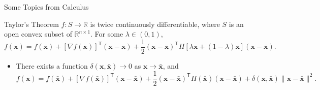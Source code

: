 \documentclass[aspectratio=169,hyperref,UTF8,CJK]{beamer}
\newcommand{\R}{\mathbb{R}}
\newcommand{\trans}{\mathsf{T}}
\newcommand{\vect}[1]{\boldsymbol{#1}}
\begin{document}
\begin{frame}{Some Topics from Calculus}
  \small
  \begin{block}{Taylor's Theorem}
    $f:S\to\R$ is twice continuously differentiable, where $S$ is an open convex subset of $\R^{n\times1}$. For some $\lambda\in(0,1)$,
    \begin{equation*}
      f(\vect{x})=f(\bar{\vect{x}})+[\nabla f(\bar{\vect{x}})]^{\trans}(\vect{x}-\bar{\vect{x}})
      +\frac12(\vect{x}-\bar{\vect{x}})^{\trans}
      H[\lambda\vect{x}+(1-\lambda)\bar{\vect{x}}](\vect{x}-\bar{\vect{x}}).
    \end{equation*}
  \end{block}
  \begin{itemize}
    \item There exists a function $\delta(\vect{x},\bar{\vect{x}})\to0$ as $\vect{x}\to\bar{\vect{x}}$, and
      \begin{equation*}
        f(\vect{x})=f(\bar{\vect{x}})+[\nabla f(\bar{\vect{x}})]^{\trans}(\vect{x}-\bar{\vect{x}})
        +\frac12(\vect{x}-\bar{\vect{x}})^{\trans}H(\bar{\vect{x}})(\vect{x}-\bar{\vect{x}})
        +\delta(\vect{x},\bar{\vect{x}})\|\vect{x}-\bar{\vect{x}}\|^2.
      \end{equation*}
  \end{itemize}
\end{frame}
\end{document}
